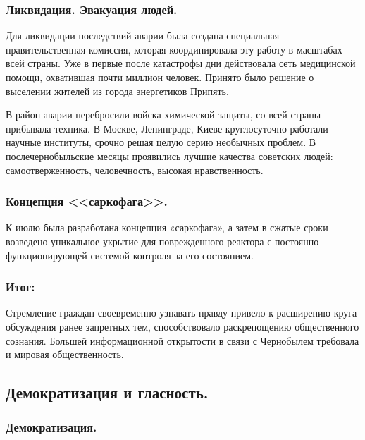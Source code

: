 \subsubsection{\textbf{Ликвидация. Эвакуация людей.}}

Для ликвидации последствий аварии была создана специальная правительственная комиссия, которая координировала эту работу в масштабах всей страны. Уже в первые после катастрофы дни действовала сеть медицинской помощи, охватившая почти миллион человек. Принято было решение о выселении жителей из города энергетиков Припять. 

В район аварии перебросили войска химической защиты, со всей страны прибывала техника. В Москве, Ленинграде, Киеве круглосуточно работали научные институты, срочно решая целую серию необычных проблем. В послечернобыльские месяцы проявились лучшие качества советских людей: самоотверженность, человечность, высокая нравственность.

\subsubsection{\textbf{Концепция <<саркофага>>.}}

К июлю была разработана концепция «саркофага», а затем в сжатые сроки возведено уникальное укрытие для поврежденного реактора с постоянно функционирующей системой контроля за его состоянием.

\subsubsection{\textbf{Итог:}}

Стремление граждан своевременно узнавать правду привело к расширению круга обсуждения ранее запретных тем, способствовало раскрепощению общественного сознания. Большей информационной открытости в связи с Чернобылем требовала и мировая общественность.

\subsection{Демократизация и гласность.}

\subsubsection{\textbf{Демократизация.}}

